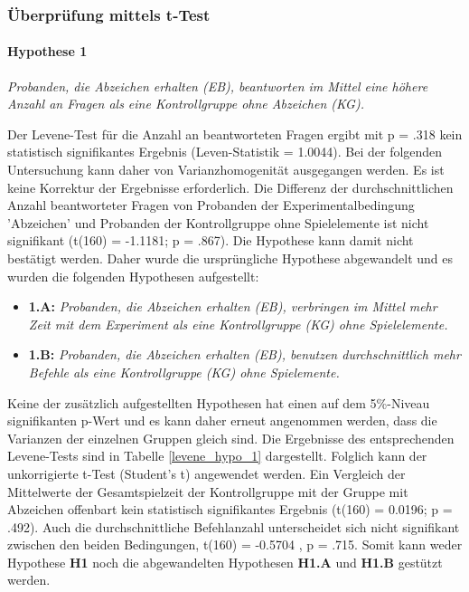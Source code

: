 \subsubsection{Überprüfung mittels t-Test}

\paragraph{Hypothese 1 }
\begin{center}
    \textit{Probanden, die Abzeichen erhalten (EB), beantworten im Mittel eine höhere Anzahl an Fragen als eine Kontrollgruppe ohne Abzeichen (KG).} 
\end{center}

Der Levene-Test für die Anzahl an beantworteten Fragen ergibt mit  p = .318 kein  statistisch  signifikantes  Ergebnis (Leven-Statistik = 1.0044). Bei der folgenden Untersuchung kann daher von Varianzhomogenität ausgegangen werden. Es ist keine Korrektur der Ergebnisse erforderlich. Die Differenz der durchschnittlichen Anzahl beantworteter Fragen von Probanden der Experimentalbedingung 'Abzeichen' und Probanden der Kontrollgruppe ohne Spielelemente ist nicht signifikant (t(160) = -1.1181; p = .867). Die Hypothese kann damit nicht bestätigt werden. Daher wurde die ursprüngliche Hypothese abgewandelt und es wurden die folgenden Hypothesen aufgestellt:

\begin{itemize}
    \item \textbf{1.A:} \textit{Probanden, die Abzeichen erhalten (EB), verbringen im Mittel mehr Zeit mit dem Experiment als eine Kontrollgruppe (KG) ohne Spielelemente.}
    \item \textbf{1.B:} \textit{Probanden, die Abzeichen erhalten (EB), benutzen durchschnittlich mehr Befehle als eine Kontrollgruppe (KG) ohne Spielemente.} 
\end{itemize}

Keine der zusätzlich aufgestellten Hypothesen hat einen auf dem 5\%-Niveau signifikanten p-Wert und es kann daher erneut angenommen werden, dass die Varianzen der einzelnen Gruppen gleich sind. Die Ergebnisse des entsprechenden Levene-Tests sind in Tabelle \ref{levene_hypo_1} dargestellt. Folglich kann der unkorrigierte t-Test (Student's t) angewendet werden. Ein Vergleich  der  Mittelwerte  der Gesamtspielzeit der Kontrollgruppe mit der Gruppe mit Abzeichen offenbart kein statistisch signifikantes Ergebnis (t(160) = 0.0196; p = .492). Auch die durchschnittliche Befehlanzahl unterscheidet sich nicht signifikant zwischen den beiden Bedingungen, t(160) = -0.5704 , p = .715. Somit kann weder Hypothese \textbf{H1} noch die abgewandelten Hypothesen \textbf{H1.A} und \textbf{H1.B} gestützt werden.


